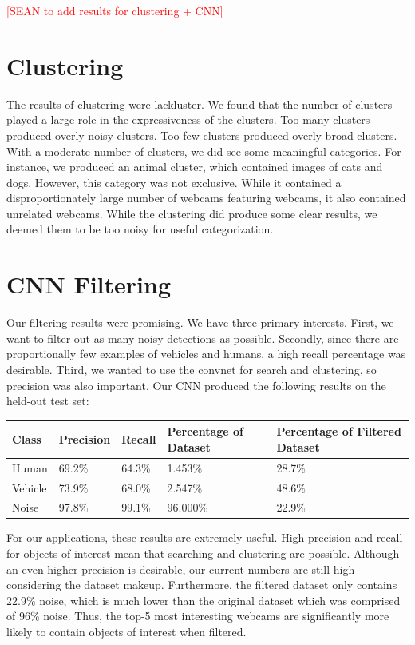 \documentclass[10pt]{article} %
\begin{document}
\textcolor{red}{[SEAN to add results for clustering + CNN]}

\section{Clustering}
The results of clustering were lackluster. We found that the number of clusters
played a large role in the expressiveness of the clusters. Too many clusters
produced overly noisy clusters. Too few clusters produced overly broad
clusters. With a moderate number of clusters, we did see some meaningful
categories. For instance, we produced an animal cluster, which contained images
of cats and dogs. However, this category was not exclusive. While it contained
a disproportionately large number of webcams featuring webcams, it also
contained unrelated webcams. While the clustering did produce some clear
results, we deemed them to be too noisy for useful categorization.

\section{CNN Filtering}
Our filtering results were promising. We have three primary interests. First,
we want to filter out as many noisy detections as possible.  Secondly, since
there are proportionally few examples of vehicles and humans, a high recall
percentage was desirable. Third, we wanted to use the convnet for search and
clustering, so precision was also important. Our CNN produced the following
results on the held-out test set:
\begin{center}
  \begin{tabular}{ | m{5em} | m{5em}| m{5em} | m{9em} | m{13em} | } 
    \hline
    Class & Precision & Recall & Percentage of Dataset & Percentage of Filtered Dataset  \\ 
    \hline
    Human & 69.2\% & 64.3\% & 1.453\% & 28.7\%  \\ 
    \hline
    Vehicle & 73.9\%  & 68.0\% & 2.547\% & 48.6\% \\ 
    \hline
    Noise & 97.8\%  &99.1\% & 96.000\% & 22.9\%  \\ 
    \hline
  \end{tabular}
\end{center}

For our applications, these results are extremely useful. High precision and
recall for objects of interest mean that searching and clustering are possible.
Although an even higher precision is desirable, our current numbers are still
high considering the dataset makeup. Furthermore, the filtered dataset only
contains 22.9\% noise, which is much lower than the original dataset which was
comprised of 96\% noise. Thus, the top-5 most interesting webcams are
significantly more likely to contain objects of interest when filtered.
\end{document}
